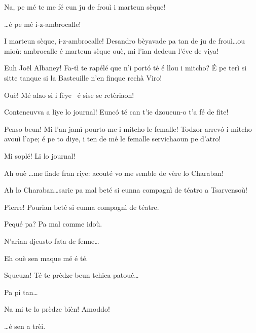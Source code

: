 \begin{drama}
\Francescaspeaks  Na, pe mé te me fé eun ju de frouì i marteun sèque!

\Joellespeaks \ldots é pe mé i-z-ambrocalle!

\Joelspeaks{} I marteun sèque, i-z-ambrocalle! Desandro bèyavade pa tan de ju de frouì\ldots ou mioù: ambrocalle é marteun sèque ouè, mi l'ian dedeun l'éve de viya!


\Francescaspeaks Euh Jo\"{e}l Albaney! Fa-tì te rapélé que n'i portó té é llou  i mitcho? \'E pe terì si sitte tanque si la Basteuille n'en finque rechà Viro!

\Vetchotspeaks Ouè! Mé alao si i fèye \pecora\ é sise se retèriaon!

\Pierrespeaks{} Conteneuvva a liye lo journal! Euncó té can t'ie dzoueun-o t'a fé de fite!

\Vetchotspeaks Penso beun! Mi l'an jamì pourto-me i mitcho le femalle! Todzor arrevó i mitcho avouì l’ape; é pe to diye, i ten de mé le femalle servichaoun pe d’atro!

\Joelspeaks Mi soplé! Li lo journal!


\Serventaspeaks Ah ouè \ldots me fiade fran riye: acouté vo me semble de vère lo Charaban!


\Joellespeaks Ah lo Charaban\ldots sarie pa mal beté si eunna compagnì de téatro a Tsarvensoù!

\Joelspeaks Pierre! Pourian beté si eunna compagnì de téatre.
 
\Pierrespeaks Pequé pa? Pa mal comme idoù. 

\Joelspeaks{} N'arian djeusto fata de fenne\ldots

\Pierrespeaks Eh ouè sen maque mé é té.


\Pierrespeaks{} Squeuza! Té te prèdze beun tchica patoué\ldots

\Serventaspeaks  Pa pi tan\ldots

\Joelspeaks Na mi te lo prèdze bièn! Amoddo!

\Pierrespeaks \ldots é sen a trèi.


\end{drama}
